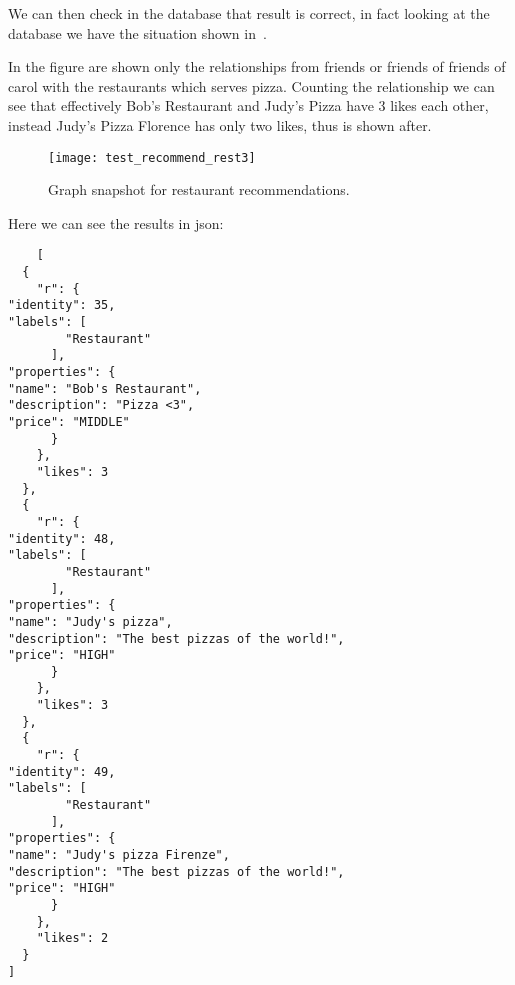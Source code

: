 We can then check in the database that result is correct, in fact looking at the
database we have the situation shown in~.

In the figure are shown only the relationships from friends or friends of
friends of carol with the restaurants which serves pizza. Counting the
 relationship we can see that effectively Bob's Restaurant and
Judy's Pizza have 3 likes each other, instead Judy's Pizza Florence has only two
likes, thus is shown after.

\begin{figure}[htb]
	\centering
	\texttt{[image: test\_recommend\_rest3]}
	\caption{Graph snapshot for restaurant recommendations.}\label{fig:recommendres3}
\end{figure}

Here we can see the results in json:

\begin{verbatim}
    [
  {
    "r": {
"identity": 35,
"labels": [
        "Restaurant"
      ],
"properties": {
"name": "Bob's Restaurant",
"description": "Pizza <3",
"price": "MIDDLE"
      }
    },
    "likes": 3
  },
  {
    "r": {
"identity": 48,
"labels": [
        "Restaurant"
      ],
"properties": {
"name": "Judy's pizza",
"description": "The best pizzas of the world!",
"price": "HIGH"
      }
    },
    "likes": 3
  },
  {
    "r": {
"identity": 49,
"labels": [
        "Restaurant"
      ],
"properties": {
"name": "Judy's pizza Firenze",
"description": "The best pizzas of the world!",
"price": "HIGH"
      }
    },
    "likes": 2
  }
]
\end{verbatim}
